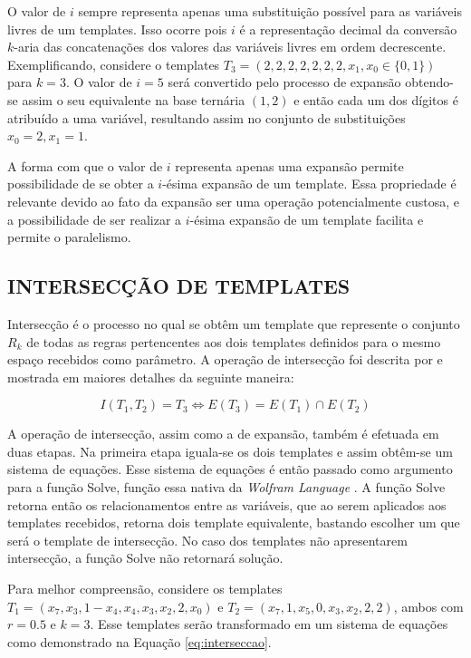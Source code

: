 \documentclass[12pt,a4paper]{article}
\begin{document}
	O valor de $i$ sempre representa apenas uma substituição possível para as variáveis livres de um templates. Isso ocorre pois $i$ é a representação decimal da conversão $k$-aria das concatenações dos valores das variáveis livres em ordem decrescente. Exemplificando, considere o templates $T_3 = (2,2,2,2,2,2,2,x_1,x_0\in \{0,1\})$ para $k=3$. O valor de $i=5$ será convertido pelo processo de expansão obtendo-se assim o seu equivalente na base ternária $(1,2)$ e então cada um dos dígitos é atribuído a uma variável, resultando assim no conjunto de substituições ${x_0=2,x_1=1}$.

	A forma com que o valor de $i$ representa apenas uma expansão permite possibilidade de se obter a $i$-ésima expansão de um template. Essa propriedade é relevante devido ao fato da expansão ser uma operação potencialmente custosa, e a possibilidade de ser realizar a $i$-ésima expansão de um template facilita e permite o paralelismo.

\newpage\newpage
\subsection{INTERSECÇÃO DE TEMPLATES}%
	Intersecção é o processo no qual se obtêm um template que represente o conjunto $R_k$ de todas as regras pertencentes aos dois templates definidos para o mesmo espaço recebidos como parâmetro. A operação de intersecção foi descrita por  e mostrada em maiores detalhes da seguinte maneira:

	\begin{equation}
	I(T_1,T_2)=T_3 \Leftrightarrow E(T_3) = E(T_1) \cap E(T_2)
	\end{equation}

	A operação de intersecção, assim como a de expansão, também é efetuada em duas etapas. Na primeira etapa iguala-se os dois templates e assim obtêm-se um sistema de equações. Esse sistema de equações é então passado como argumento para a função Solve, função essa nativa da \textit{Wolfram Language} \cite{woframMathematica10}. A função Solve retorna então os relacionamentos entre as variáveis, que ao serem aplicados aos templates recebidos, retorna dois template equivalente, bastando escolher um que será o template de intersecção. No caso dos templates não apresentarem intersecção, a função Solve não retornará solução.

	Para melhor compreensão, considere os templates $T_1 = (x_7,x_3,1-x_4,x_4,x_3,x_2,2,x_0)$ e $T_2 = (x_7,1,x_5,0,x_3,x_2,2,2)$, ambos com $r=0.5$ e $k=3$. Esse templates serão transformado em um sistema de equações como demonstrado na Equação \ref{eq:interseccao}.
\end{document}
